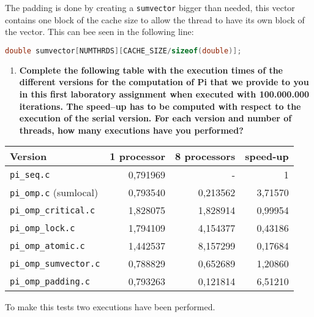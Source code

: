 \documentclass[a4paper]{article}
\begin{document}
The padding is done by creating a \verb|sumvector| bigger than needed, this vector contains one block of the cache size to allow the thread to have its own block of the vector. This can bee seen in the following line:

\begin{lstlisting}[language=C]
double sumvector[NUMTHRDS][CACHE_SIZE/sizeof(double)];
\end{lstlisting}


\begin{enumerate}[resume]
	\item \textbf{ Complete the following table with the execution times of the different versions for the computation of Pi that we provide to you in this first laboratory assignment when executed with 100.000.000 iterations. The speed–up has to be computed with respect to the execution of the serial version. For each version and number of threads, how many executions have you performed? }
\end{enumerate}

\begin{table}[H]
	\centering
	\begin{tabular}{l|rrr}
		\textbf{Version} & \textbf{1 processor} & \textbf{8 processors} & \textbf{speed-up} \\
		\hline
		\verb|pi_seq.c| & 0,791969  & - & 1 \\
		\verb|pi_omp.c| (sumlocal) & 0,793540 & 0,213562 & 3,71570  \\
		\verb|pi_omp_critical.c| & 1,828075 & 1,828914 & 0,99954  \\
		\verb|pi_omp_lock.c| & 1,794109 & 4,154377 & 0,43186  \\
		\verb|pi_omp_atomic.c| & 1,442537 & 8,157299 & 0,17684  \\
		\verb|pi_omp_sumvector.c| & 0,788829 & 0,652689 & 1,20860  \\
		\verb|pi_omp_padding.c| & 0,793263 & 0,121814 & 6,51210  \\
	\end{tabular}
\end{table}

To make this tests two executions have been performed.
\end{document}
